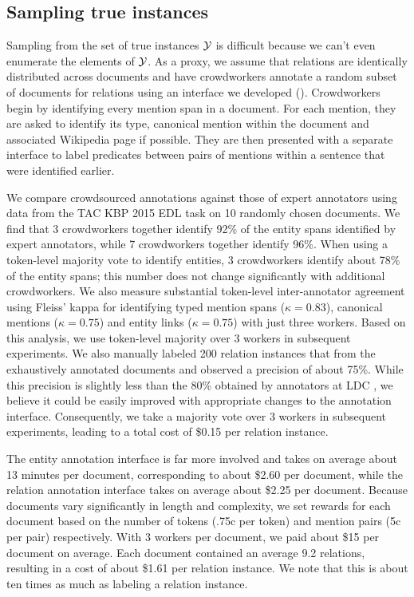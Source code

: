 \subsection{Sampling true instances}
Sampling from the set of true instances $\mathcal{Y}$ is difficult because we can't even enumerate the elements of $\mathcal{Y}$.
As a proxy, we assume that relations are identically distributed across documents and have crowdworkers annotate a random subset of documents for relations using an interface we developed ().
Crowdworkers begin by identifying every mention span in a document.
  For each mention, they are asked to identify its type, canonical mention within the document
  and associated Wikipedia page if possible.
They are then presented with a separate interface to label predicates between pairs of mentions within a sentence that were identified earlier.

We compare crowdsourced annotations against those of expert annotators using data from the TAC KBP 2015 EDL task on 10 randomly chosen documents.
We find that 3 crowdworkers together identify 92\% of the entity spans identified by expert annotators, while 7 crowdworkers together identify 96\%.
When using a token-level majority vote to identify entities, 3 crowdworkers identify about 78\% of the entity spans; this number does not change significantly with additional crowdworkers.
We also measure substantial token-level inter-annotator agreement using Fleiss' kappa for identifying typed mention spans ($\kappa = 0.83$), canonical mentions ($\kappa = 0.75$) and entity links ($\kappa = 0.75$) with just three workers.
Based on this analysis, we use token-level majority over 3 workers in subsequent experiments.
We also manually labeled 200 relation instances that from the exhaustively annotated documents and observed a precision of about 75\%.
While this precision is slightly less than the 80\% obtained by annotators at LDC \citep{ellis2016overview}, we believe it could be easily improved with appropriate changes to the annotation interface.
Consequently, we take a majority vote over 3 workers in subsequent experiments,
leading to a total cost of \$0.15 per relation instance.

The entity annotation interface is far more involved and takes on average about 13 minutes per document, corresponding to about \$2.60 per document, while the relation annotation interface takes on average about \$2.25 per document.
Because documents vary significantly in length and complexity, we set rewards for each document based on the number of tokens (.75c per token) and mention pairs (5c per pair) respectively.
With 3 workers per document, we paid about \$15 per document on average.
Each document contained an average 9.2 relations, resulting in a cost of about \$1.61 per relation instance.
We note that this is about ten times as much as labeling a relation instance.

